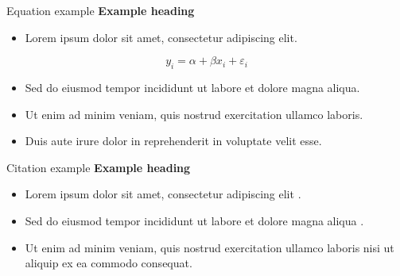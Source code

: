\begin{frame}[t]{Equation example}
    \textbf{Example heading}
    \begin{itemize}
        \item Lorem ipsum dolor sit amet, consectetur adipiscing elit.
    \end{itemize}
    \begin{equation*}
        y_i = \alpha + \beta x_i + \varepsilon_i
    \end{equation*}
    \begin{itemize}
        \item Sed do eiusmod tempor incididunt ut labore et dolore magna aliqua.
        \item Ut enim ad minim veniam, quis nostrud exercitation ullamco laboris.
        \item Duis aute irure dolor in reprehenderit in voluptate velit esse.
    \end{itemize}
\end{frame}

\begin{frame}[t]{Citation example}
    \textbf{Example heading}
    \begin{itemize}
        \item Lorem ipsum dolor sit amet, consectetur adipiscing elit
            \parencite{example-article}.
        \item Sed do eiusmod tempor incididunt ut labore et dolore magna aliqua
            \parencite{example-book}.
        \item Ut enim ad minim veniam, quis nostrud exercitation ullamco laboris
            nisi ut aliquip ex ea commodo consequat.
    \end{itemize}
\end{frame}

